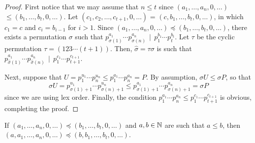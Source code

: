 \begin{proof}
First notice that we may assume that $n \leq t$ since
$(a_1,\ldots,a_n,0,\ldots)$ $\leq (b_1,\ldots,b_t,0,\ldots)$.  Let
$(c_1,c_2,\ldots,c_{t+1},0,\ldots)$ =
$(c,b_1,\ldots,b_t,0,\ldots)$, in which $c_1 = c$ and $c_i =
b_{i-1}$ for $i > 1$.  Since $(a_1,\ldots,a_n,0,\ldots) \preceq
(b_1,\ldots,b_t,0,\ldots)$, there exists a permutation $\sigma$
such that $p_{\sigma(1)}^{a_1} \cdots p_{\sigma(n)}^{a_n} \, \mid
\, p_{1}^{b_1} \cdots p_{t}^{b_t}$. Let $\tau$ be the cyclic
permutation $\tau = (123 \cdots (t+1))$.   Then, $\hat{\sigma} =
\tau \sigma$ is such that $p_{\hat{\sigma}(1)}^{a_1} \cdots
p_{\hat{\sigma}(n)}^{a_n} \, \mid \, p_{1}^{c_1} \cdots
p_{t+1}^{c_{t+1}}$.

Next, suppose that $U = p_1^{u_1} \cdots p_n^{u_n} \leq
p_{1}^{a_1} \cdots p_{n}^{a_n} = P$.  By assumption, $\sigma U
\leq \sigma P$, so that \[\hat{\sigma} U = p_{\sigma(1)+1}^{u_1}
\cdots p_{\sigma(n)+1}^{u_n} \leq p_{\sigma(1)+1}^{a_1} \cdots
p_{\sigma(n)+1}^{a_n} = \hat{\sigma} P\] since we are using lex
order.  Finally, the condition $p_{1}^{a_1} \cdots p_{n}^{a_n}
\leq p_{1}^{c_1} \cdots p_{t+1}^{c_{t+1}}$ is obvious, completing
the proof.
\end{proof}

\begin{lemma}\label{twoshiftuplem}
If $(a_1,\ldots,a_n,0,\ldots) \preceq (b_1,\ldots,b_t,0,\ldots)$
and $a,b \in {\mathbb N}$ are such that $a \leq b$, then
$(a,a_1,\ldots,a_n,0,\ldots) \preceq (b,b_1,\ldots,b_t,0,\ldots)$.
\end{lemma}

